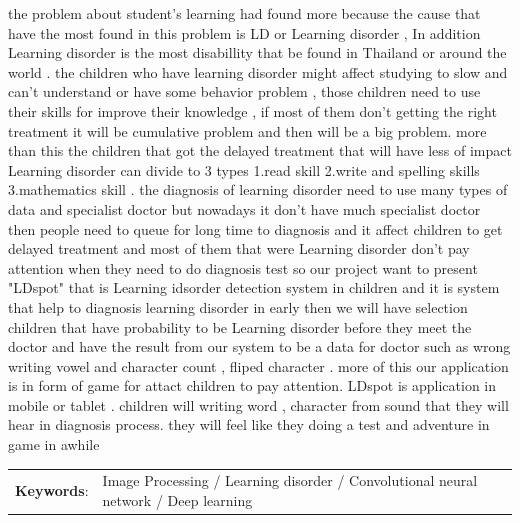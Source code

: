 \documentclass[12pt,oneside,openright,a4paper]{cpe-thai-project}
\begin{document}
\makesignaturepage 

\abstract

the problem about student's learning had found more because the cause that have the most found
 in this problem is LD or Learning disorder , In addition Learning disorder is the most disabillity that be found in Thailand
or around the world . the children who have learning disorder might affect studying to slow and can't understand or have some
behavior problem , those children need to use their skills for improve their knowledge , if most of them don't getting the right treatment 
it will be cumulative problem and then will be a big problem. more than this the children that got the delayed treatment that will have less of impact 
    Learning disorder can divide to 3 types 1.read skill 2.write and spelling skills 3.mathematics skill . the diagnosis of learning disorder need to use 
many types of data and specialist doctor  but nowadays it don't have much specialist doctor then people need to queue for long time to diagnosis and it affect 
children to get delayed treatment and most of them that were Learning disorder don't pay attention when they need to do diagnosis test 
    so our project want to present "LDspot" that is Learning idsorder detection system in children and it is system that help to diagnosis learning disorder in early 
then we will have selection children that have probability to be Learning disorder before they meet the doctor and have the result from our system to be a data for doctor
such as wrong writing vowel and character count , fliped character . more of this our application is in form of game for attact children to pay attention. LDspot is application in 
mobile or tablet . children will writing word , character from sound that they will hear in diagnosis process. they will feel like they doing a test and adventure in game in awhile
\begin{flushleft}
\begin{tabular*}{\textwidth}{@{}lp{}}
\textbf{Keywords}: & Image Processing / Learning disorder / Convolutional neural network / Deep learning
\end{tabular*}
\end{flushleft}
\endabstract
\end{document}
